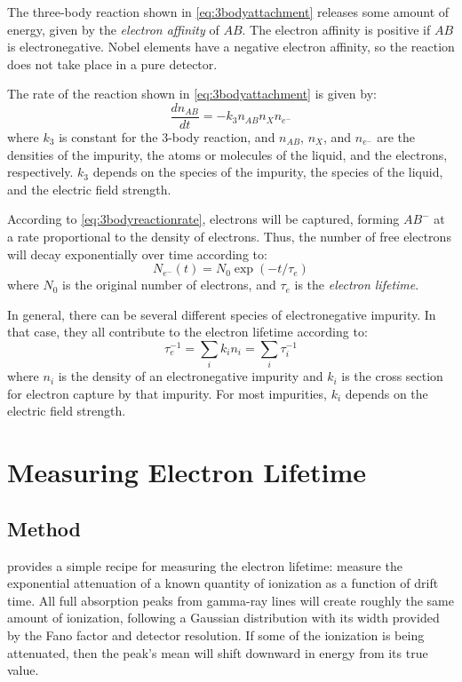\documentclass[herrin-thesis.tex]{subfiles}
\begin{document}
The three-body reaction shown in \cref{eq:3bodyattachment} releases some amount of energy, given by the \emph{electron affinity} of \(AB\). The electron affinity is positive if \(AB\) is electronegative. Nobel elements have a negative electron affinity, so the reaction does not take place in a pure detector.

The rate of the reaction shown in \cref{eq:3bodyattachment} is given by:
\begin{equation}
\frac{dn_{AB}}{dt} = -k_{3} n_{AB} n_{X} n_{e^{-}}
\label{eq:3bodyreactionrate}
\end{equation}
where \(k_3\) is constant for the 3-body reaction, and \(n_{AB}\), \(n_{X}\), and \(n_{e^{-}}\) are the densities of the impurity, the atoms or molecules of the liquid, and the electrons, respectively. \(k_3\) depends on the species of the impurity, the species of the liquid, and the electric field strength.

According to \cref{eq:3bodyreactionrate}, electrons will be captured, forming \(AB^{-}\) at a rate proportional to the density of electrons. Thus, the number of free electrons will decay exponentially over time according to:
\begin{equation}
N_{e^{-}}(t) = N_0 \exp (-t/\tau_e)
\label{eq:exponentialtaue}
\end{equation}
where \(N_0\) is the original number of electrons, and \(\tau_e\) is the \emph{electron lifetime}.

In general, there can be several different species of electronegative impurity. In that case, they all contribute to the electron lifetime according to:
\begin{equation}
\tau_e^{-1} = \sum_i k_i n_i = \sum_i\tau_i^{-1}
\label{eq:tauedefinition}
\end{equation}
where \(n_i\) is the density of an electronegative impurity and \(k_i\) is the cross section for electron capture by that impurity. For most impurities, \(k_i\) depends on the electric field strength.

\section{Measuring Electron Lifetime}

\subsection{Method}
 provides a simple recipe for measuring the electron lifetime: measure the exponential attenuation of a known quantity of ionization as a function of drift time. All full absorption peaks from gamma-ray lines will create roughly the same amount of ionization, following a Gaussian distribution with its width provided by the Fano factor and detector resolution. If some of the ionization is being attenuated, then the peak's mean will shift downward in energy from its true value.
\end{document}
